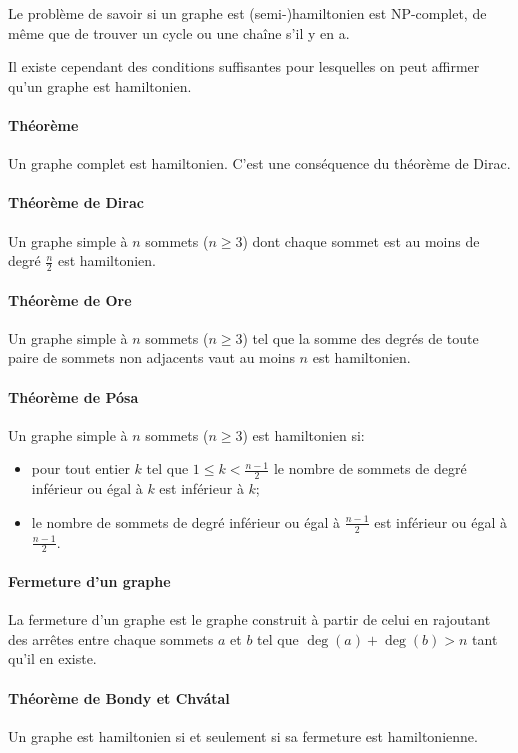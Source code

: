    Le problème de savoir si un graphe est (semi-)hamiltonien est NP-complet,
    de même que de trouver un cycle ou une chaîne s'il y en a.

    Il existe cependant des conditions suffisantes pour lesquelles on peut
    affirmer qu'un graphe est hamiltonien.

    \paragraph{Théorème} Un graphe complet est hamiltonien. C'est une
    conséquence du théorème de Dirac.

    \paragraph{Théorème de Dirac} Un graphe simple à $n$ sommets ($n \ge 3$)
    dont chaque sommet est au moins de degré $\frac{n}{2}$ est hamiltonien.

    \paragraph{Théorème de Ore} Un graphe simple à $n$ sommets ($n \ge 3$) tel
    que la somme des degrés de toute paire de sommets non adjacents vaut au
    moins $n$ est hamiltonien.

    \paragraph{Théorème de Pósa} Un graphe simple à $n$ sommets ($n \ge 3$) est
    hamiltonien si:
    \begin{itemize}
      \item pour tout entier $k$ tel que $1 \le k < \frac{n-1}{2}$ le nombre de
        sommets de degré inférieur ou égal à $k$ est inférieur à $k$;
      \item le nombre de sommets de degré inférieur ou égal à $\frac{n-1}{2}$
        est inférieur ou égal à $\frac{n-1}{2}$.
    \end{itemize}

    \paragraph{Fermeture d'un graphe} La fermeture d'un graphe est
    le graphe construit à partir de celui en rajoutant des arrêtes entre chaque
    sommets $a$ et $b$ tel que $\deg(a)+\deg(b) > n$ tant qu'il en existe.

    \paragraph{Théorème de Bondy et Chvátal} Un graphe est hamiltonien si et
    seulement si sa fermeture est hamiltonienne.

